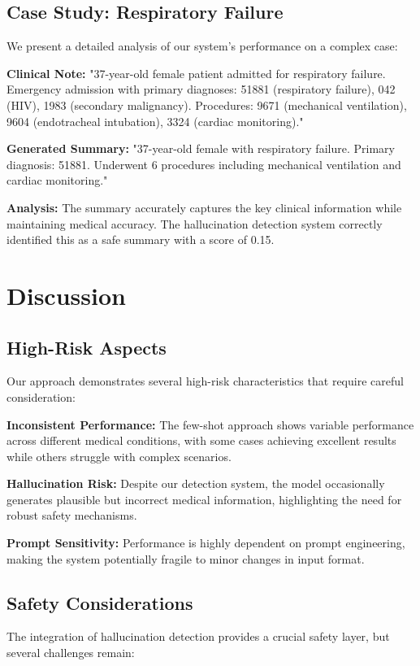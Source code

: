 \documentclass[sigconf]{acmart}
\begin{document}
\subsection{Case Study: Respiratory Failure}
We present a detailed analysis of our system's performance on a complex case:

\textbf{Clinical Note:} "37-year-old female patient admitted for respiratory failure. Emergency admission with primary diagnoses: 51881 (respiratory failure), 042 (HIV), 1983 (secondary malignancy). Procedures: 9671 (mechanical ventilation), 9604 (endotracheal intubation), 3324 (cardiac monitoring)."

\textbf{Generated Summary:} "37-year-old female with respiratory failure. Primary diagnosis: 51881. Underwent 6 procedures including mechanical ventilation and cardiac monitoring."

\textbf{Analysis:} The summary accurately captures the key clinical information while maintaining medical accuracy. The hallucination detection system correctly identified this as a safe summary with a score of 0.15.

\section{Discussion}
\label{sec:discussion}

\subsection{High-Risk Aspects}
Our approach demonstrates several high-risk characteristics that require careful consideration:

\textbf{Inconsistent Performance:} The few-shot approach shows variable performance across different medical conditions, with some cases achieving excellent results while others struggle with complex scenarios.

\textbf{Hallucination Risk:} Despite our detection system, the model occasionally generates plausible but incorrect medical information, highlighting the need for robust safety mechanisms.

\textbf{Prompt Sensitivity:} Performance is highly dependent on prompt engineering, making the system potentially fragile to minor changes in input format.

\subsection{Safety Considerations}
The integration of hallucination detection provides a crucial safety layer, but several challenges remain:
\end{document}
